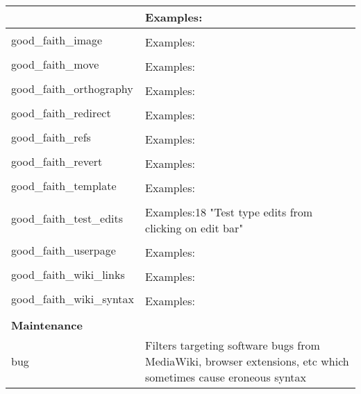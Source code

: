 \begin{longtable}{ | p{5cm} | p{9cm} | }
                                     & Examples:\\
    \hline
    \multirow{2}{*}{good\_faith\_image} & \\
                                     & Examples:\\
    \hline
    \multirow{2}{*}{good\_faith\_move} & \\
                                     & Examples:\\
    \hline
    \multirow{2}{*}{good\_faith\_orthography} & \\
                                     & Examples:\\
    \hline
    \multirow{2}{*}{good\_faith\_redirect} & \\
                                     & Examples:\\
    \hline
    \multirow{2}{*}{good\_faith\_refs} & \\
                                     & Examples:\\
    \hline
    \multirow{2}{*}{good\_faith\_revert} & \\
                                     & Examples:\\
    \hline
    \multirow{2}{*}{good\_faith\_template} & \\
                                     & Examples:\\
    \hline
    \multirow{2}{*}{good\_faith\_test\_edits} & \\
                                     & Examples:18 "Test type edits from clicking on edit bar"\\
    \hline
    \multirow{2}{*}{good\_faith\_userpage} & \\
                                     & Examples:\\
    \hline
    \multirow{2}{*}{good\_faith\_wiki\_links} & \\
                                     & Examples:\\
    \hline
    \multirow{2}{*}{good\_faith\_wiki\_syntax} & \\
                                     & Examples:\\
    \hline
        \multicolumn{2}{|l|}{} \\
    \hline \hline
        \multicolumn{2}{|l|}{\textbf{Maintenance}} \\
    \hline
    \multirow{2}{*}{bug} & Filters targeting software bugs from MediaWiki, browser extensions, etc which sometimes cause eroneous syntax\\

\end{longtable}
